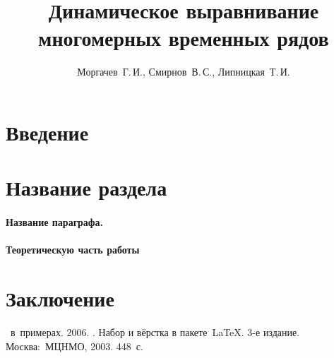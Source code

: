 \documentclass[12pt,twoside]{article}
\title
        {Динамическое выравнивание многомерных временных рядов}
\author
        {Моргачев~Г.\,И., Смирнов~В.\,С., Липницкая~Т.\,И.} %
\begin{document}
    \maketitle
    \section{Введение}
    \section{Название раздела}
    \paragraph{Название параграфа.}
    \paragraph{Теоретическую часть работы}
    \section{Заключение}

    
    

    \begin{thebibliography}{1}
       \LaTeXe\ в~примерах.
       2006.
       .
        Набор и вёрстка в пакете~\LaTeX.
       3-е издание.
       Москва:~МЦHМО, 2003.  448~с.
    \end{thebibliography}
    
    
\end{document}
